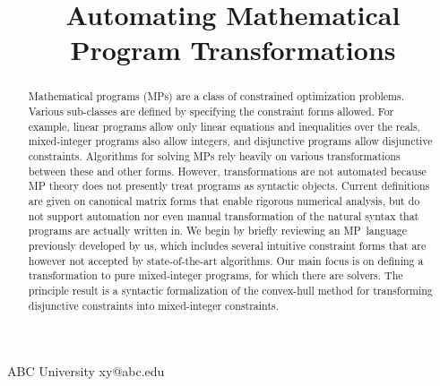 \documentclass[preprint]{sigplanconf}%
\theoremstyle{remark}
\begin{document}
%
\copyrightdata{[to be supplied]}
\title{Automating Mathematical Program Transformations}
{ABC University}
{xy@abc.edu}
\maketitle
%

\begin{abstract}%


Mathematical programs (MPs) are a class of constrained optimization problems.
Various sub-classes are defined by specifying the constraint forms allowed.
For example, linear programs allow only linear equations and inequalities over
the reals, mixed-integer programs also allow integers, and disjunctive
programs allow disjunctive constraints. Algorithms for solving MPs rely
heavily on various transformations between these and other forms. However,
transformations are not automated because MP theory does not presently treat
programs as syntactic objects. Current definitions are given on canonical
matrix forms that enable rigorous numerical analysis, but do not support
automation nor even manual transformation of the natural syntax that programs
are actually written in. We begin by briefly reviewing an MP\ language
previously developed by us, which includes several intuitive constraint forms
that are however not accepted by state-of-the-art algorithms. Our main focus
is on defining a transformation to pure mixed-integer programs, for which
there are solvers. The principle result is a syntactic formalization of the
convex-hull method for transforming disjunctive constraints into mixed-integer constraints.%

\end{abstract}%
%
\end{document}
